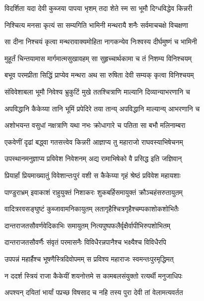 
\twolineshloka
{विदर्शिता यदा देवी कुब्जया पापया भृशम्}
{तदा शेते स्म सा भूमौ दिग्धविद्धेव किन्नरी} %

\twolineshloka
{निश्चित्य मनसा कृत्यं सा सम्यगिति भामिनी}
{मन्थरायै शनैः सर्वमाचचक्षे विचक्षणा} %

\twolineshloka
{सा दीना निश्चयं कृत्वा मन्थरावाक्यमोहिता}
{नागकन्येव निःश्वस्य दीर्घमुष्णं च भामिनी} %

\twolineshloka
{मुहूर्तं चिन्तयामास मार्गमात्मसुखावहम्}
{सा सुहृच्चार्थकामा च तं निशम्य विनिश्चयम्} %

\twolineshloka
{बभूव परमप्रीता सिद्धिं प्राप्येव मन्थरा}
{अथ सा रुषिता देवी सम्यक् कृत्वा विनिश्चयम्} %

\twolineshloka
{संविवेशाबला भूमौ निवेश्य भ्रुकुटिं मुखे}
{ततश्चित्राणि माल्यानि दिव्यान्याभरणानि च} %

\twolineshloka
{अपविद्धानि कैकेय्या तानि भूमिं प्रपेदिरे}
{तया तान्य् अपविद्धानि माल्यान्य् आभरणानि च} %

\twolineshloka
{अशोभयन्त वसुधां नक्षत्राणि यथा नभः}
{क्रोधागारे च पतिता सा बभौ मलिनाम्बरा} %

\twolineshloka
{एकवेणीं दृढां बद्ध्वा गतसत्त्वेव किन्नरी}
{आज्ञाप्य तु महाराजो राघवस्याभिषेचनम्} %

\twolineshloka
{उपस्थानमनुज्ञाप्य प्रविवेश निवेशनम्}
{अद्य रामाभिषेको वै प्रसिद्ध इति जज्ञिवान्} %

\twolineshloka
{प्रियार्हां प्रियमाख्यातुं विवेशान्तःपुरं वशी}
{स कैकेय्या गृहं श्रेष्ठं प्रविवेश महायशाः} %

\twolineshloka
{पाण्डुराभ्रम् इवाकाशं राहुयुक्तं निशाकरः}
{शुकबर्हिसमायुक्तं क्रौञ्चहंसरुतायुतम्} %

\twolineshloka
{वादित्ररवसङ्घुष्टं कुब्जावामनिकायुतम्}
{लतागृहैश्चित्रगृहैश्चम्पकाशोकशोभितैः} %

\twolineshloka
{दान्तराजतसौवर्णवेदिकाभिः समायुतम्}
{नित्यपुष्पफलैर्वृक्षैर्वापीभिरुपशोभितम्} %

\twolineshloka
{दान्तराजतसौवर्णैः संवृतं परमासनैः}
{विविधैरन्नपानैश्च भक्ष्यैश्च विविधैरपि} %

\twolineshloka
{उपपन्नं महार्हैश्च भूषणैस्त्रिदिवोपमम्}
{स प्रविश्य महाराजः स्वमन्तःपुरमृद्धिमत्} %

\twolineshloka
{न ददर्श स्त्रियं राजा कैकेयीं शयनोत्तमे}
{स कामबलसंयुक्तो रत्यर्थी मनुजाधिपः} %

\twolineshloka
{अपश्यन् दयितां भार्यां पप्रच्छ विषसाद च}
{नहि तस्य पुरा देवी तां वेलामत्यवर्तत} %

